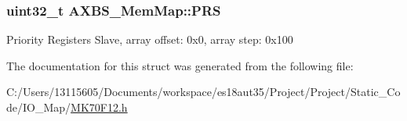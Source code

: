 \subsubsection[{P\+R\+S}]{\setlength{\rightskip}{0pt plus 5cm}uint32\+\_\+t A\+X\+B\+S\+\_\+\+Mem\+Map\+::\+P\+R\+S}\label{struct_a_x_b_s___mem_map_a840c4c5791c39bad3cfa7140aaab0a1f}
Priority Registers Slave, array offset\+: 0x0, array step\+: 0x100 

The documentation for this struct was generated from the following file\+:\begin{DoxyCompactItemize}
\item 
C\+:/\+Users/13115605/\+Documents/workspace/es18aut35/\+Project/\+Project/\+Static\+\_\+\+Code/\+I\+O\+\_\+\+Map/\hyperlink{_m_k70_f12_8h}{M\+K70\+F12.\+h}\end{DoxyCompactItemize}
